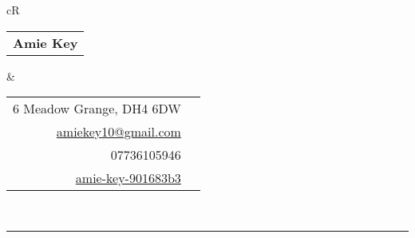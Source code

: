 \documentclass[12pt, a4paper]{article}
\begin{document}
	\noindent
	\begin{tabularx}{\textwidth}{cR}
		\begin{tabular}{l}
			{\fontfamily{lmr}\selectfont
				\textbf{
				\HUGE Amie Key}
			}
		 \\
		\end{tabular} & 
	
		\begin{tabular}{rc}
			6 Meadow Grange, DH4 6DW & \faHome\\
			\href{mailto:amiekey10@gmail.com}{amiekey10@gmail.com} & \href{mailto:amiekey10@gmail.com}{\faEnvelope}\\
			07736105946 & \faPhone \\
			\href{https://www.linkedin.com/in/amie-key-901683b3/}{amie-key-901683b3} & \href{https://www.linkedin.com/in/amie-key-901683b3/}{\faLinkedin} \\
		\end{tabular} \\
	\end{tabularx}

	\par\noindent\rule{\textwidth}{0.2pt}
\end{document}
